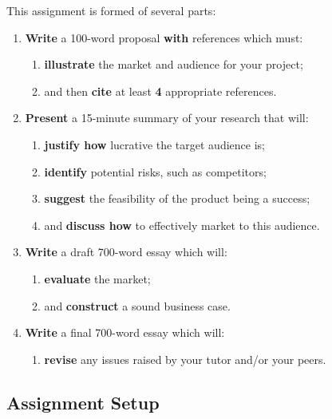 \documentclass{../fal_assignment}
\newcommand{\proposalWordCount}{100}
\newcommand{\essayWordCount}{700}
\newcommand{\presentationMinutes}{15}
\newcommand{\minReferenceCount}{4 }
\begin{document}
This assignment is formed of several parts:

\begin{enumerate}[label=(\Alph*)]
    \item \textbf{Write} a \proposalWordCount-word proposal \textbf{with} references which must:
    	\begin{enumerate}[label=\roman*.]
    		\item \textbf{illustrate} the market and audience for your project;
    		\item and then \textbf{cite} at least \textbf{\minReferenceCount} appropriate references.
	\end{enumerate}
    \item \textbf{Present} a \presentationMinutes-minute summary of your research that will:
    	\begin{enumerate}[label=\roman*.]
    		\item \textbf{justify how} lucrative the target audience is;
    		\item \textbf{identify} potential risks, such as competitors;
    		\item \textbf{suggest} the feasibility of the product being a success;
    		\item and \textbf{discuss how} to effectively market to this audience.
	\end{enumerate}
    \item \textbf{Write} a draft \essayWordCount-word essay which will:
    	\begin{enumerate}[label=\roman*.]
    		\item  \textbf{evaluate} the market;
    		\item  and \textbf{construct} a sound business case.
	\end{enumerate}
    \item \textbf{Write} a final \essayWordCount-word essay which will:
    	\begin{enumerate}[label=\roman*.]
    		\item \textbf{revise} any issues raised by your tutor and/or your peers.
	\end{enumerate}
\end{enumerate}


\subsection*{Assignment Setup}
\end{document}
